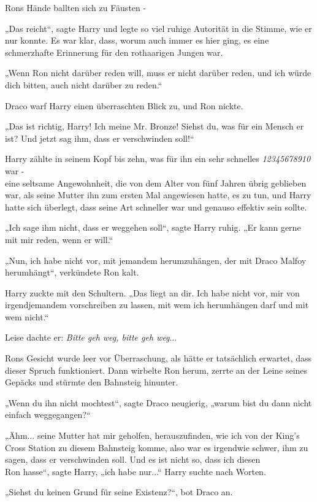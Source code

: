 {Rons Hände ballten sich zu Fäusten -

„Das reicht“, sagte Harry und legte so viel ruhige Autorität in die Stimme, wie er nur konnte. Es war klar, dass, worum auch immer es hier ging, es eine schmerzhafte Erinnerung für den rothaarigen Jungen war.

„Wenn Ron nicht darüber reden will, muss er nicht darüber reden, und ich würde dich bitten, auch nicht darüber zu reden.“

Draco warf Harry einen überraschten Blick zu, und Ron nickte.

„Das ist richtig, Harry! Ich meine Mr. Bronze! Siehst du, was für ein Mensch er ist? Und jetzt sag ihm, dass er verschwinden soll!“

Harry zählte in seinem Kopf bis zehn, was für ihn ein sehr schnelles \emph{12345678910} war -\\ eine seltsame Angewohnheit, die von dem Alter von fünf Jahren übrig geblieben war, als seine Mutter ihn zum ersten Mal angewiesen hatte, es zu tun, und Harry hatte sich überlegt, dass seine Art schneller war und genauso effektiv sein sollte.

„Ich sage ihm nicht, dass er weggehen soll“, sagte Harry ruhig. „Er kann gerne mit mir reden, wenn er will.“

„Nun, ich habe nicht vor, mit jemandem herumzuhängen, der mit Draco Malfoy herumhängt“, verkündete Ron kalt.

Harry zuckte mit den Schultern. „Das liegt an dir. Ich habe nicht vor, mir von irgendjemandem vorschreiben zu lassen, mit wem ich herumhängen darf und mit wem nicht.“

Leise dachte er: \emph{Bitte geh weg, bitte geh weg}...

Rons Gesicht wurde leer vor Überraschung, als hätte er tatsächlich erwartet, dass dieser Spruch funktioniert. Dann wirbelte Ron herum, zerrte an der Leine seines Gepäcks und stürmte den Bahnsteig hinunter.

„Wenn du ihn nicht mochtest“, sagte Draco neugierig, „warum bist du dann nicht einfach weggegangen?“

„Ähm... seine Mutter hat mir geholfen, herauszufinden, wie ich von der King's Cross Station zu diesem Bahnsteig komme, also war es irgendwie schwer, ihm zu sagen, dass er verschwinden soll. Und es ist nicht so, dass ich diesen\\ Ron hasse“, sagte Harry, „ich habe nur...“ Harry suchte nach Worten.

„Siehst du keinen Grund für seine Existenz?“, bot Draco an.

}
